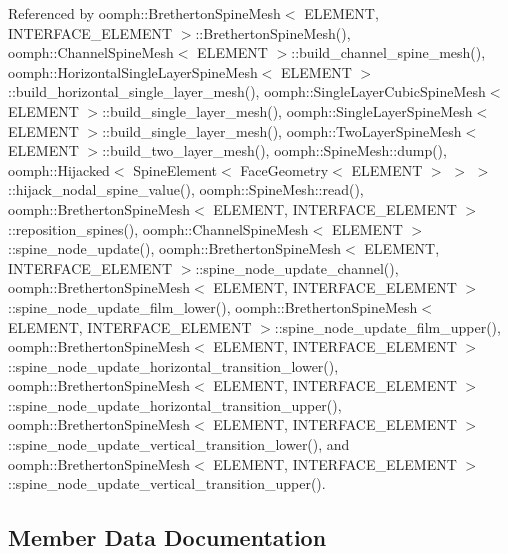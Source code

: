 Referenced by oomph\+::\+Bretherton\+Spine\+Mesh$<$ E\+L\+E\+M\+E\+N\+T, I\+N\+T\+E\+R\+F\+A\+C\+E\+\_\+\+E\+L\+E\+M\+E\+N\+T $>$\+::\+Bretherton\+Spine\+Mesh(), oomph\+::\+Channel\+Spine\+Mesh$<$ E\+L\+E\+M\+E\+N\+T $>$\+::build\+\_\+channel\+\_\+spine\+\_\+mesh(), oomph\+::\+Horizontal\+Single\+Layer\+Spine\+Mesh$<$ E\+L\+E\+M\+E\+N\+T $>$\+::build\+\_\+horizontal\+\_\+single\+\_\+layer\+\_\+mesh(), oomph\+::\+Single\+Layer\+Cubic\+Spine\+Mesh$<$ E\+L\+E\+M\+E\+N\+T $>$\+::build\+\_\+single\+\_\+layer\+\_\+mesh(), oomph\+::\+Single\+Layer\+Spine\+Mesh$<$ E\+L\+E\+M\+E\+N\+T $>$\+::build\+\_\+single\+\_\+layer\+\_\+mesh(), oomph\+::\+Two\+Layer\+Spine\+Mesh$<$ E\+L\+E\+M\+E\+N\+T $>$\+::build\+\_\+two\+\_\+layer\+\_\+mesh(), oomph\+::\+Spine\+Mesh\+::dump(), oomph\+::\+Hijacked$<$ Spine\+Element$<$ Face\+Geometry$<$ E\+L\+E\+M\+E\+N\+T $>$ $>$ $>$\+::hijack\+\_\+nodal\+\_\+spine\+\_\+value(), oomph\+::\+Spine\+Mesh\+::read(), oomph\+::\+Bretherton\+Spine\+Mesh$<$ E\+L\+E\+M\+E\+N\+T, I\+N\+T\+E\+R\+F\+A\+C\+E\+\_\+\+E\+L\+E\+M\+E\+N\+T $>$\+::reposition\+\_\+spines(), oomph\+::\+Channel\+Spine\+Mesh$<$ E\+L\+E\+M\+E\+N\+T $>$\+::spine\+\_\+node\+\_\+update(), oomph\+::\+Bretherton\+Spine\+Mesh$<$ E\+L\+E\+M\+E\+N\+T, I\+N\+T\+E\+R\+F\+A\+C\+E\+\_\+\+E\+L\+E\+M\+E\+N\+T $>$\+::spine\+\_\+node\+\_\+update\+\_\+channel(), oomph\+::\+Bretherton\+Spine\+Mesh$<$ E\+L\+E\+M\+E\+N\+T, I\+N\+T\+E\+R\+F\+A\+C\+E\+\_\+\+E\+L\+E\+M\+E\+N\+T $>$\+::spine\+\_\+node\+\_\+update\+\_\+film\+\_\+lower(), oomph\+::\+Bretherton\+Spine\+Mesh$<$ E\+L\+E\+M\+E\+N\+T, I\+N\+T\+E\+R\+F\+A\+C\+E\+\_\+\+E\+L\+E\+M\+E\+N\+T $>$\+::spine\+\_\+node\+\_\+update\+\_\+film\+\_\+upper(), oomph\+::\+Bretherton\+Spine\+Mesh$<$ E\+L\+E\+M\+E\+N\+T, I\+N\+T\+E\+R\+F\+A\+C\+E\+\_\+\+E\+L\+E\+M\+E\+N\+T $>$\+::spine\+\_\+node\+\_\+update\+\_\+horizontal\+\_\+transition\+\_\+lower(), oomph\+::\+Bretherton\+Spine\+Mesh$<$ E\+L\+E\+M\+E\+N\+T, I\+N\+T\+E\+R\+F\+A\+C\+E\+\_\+\+E\+L\+E\+M\+E\+N\+T $>$\+::spine\+\_\+node\+\_\+update\+\_\+horizontal\+\_\+transition\+\_\+upper(), oomph\+::\+Bretherton\+Spine\+Mesh$<$ E\+L\+E\+M\+E\+N\+T, I\+N\+T\+E\+R\+F\+A\+C\+E\+\_\+\+E\+L\+E\+M\+E\+N\+T $>$\+::spine\+\_\+node\+\_\+update\+\_\+vertical\+\_\+transition\+\_\+lower(), and oomph\+::\+Bretherton\+Spine\+Mesh$<$ E\+L\+E\+M\+E\+N\+T, I\+N\+T\+E\+R\+F\+A\+C\+E\+\_\+\+E\+L\+E\+M\+E\+N\+T $>$\+::spine\+\_\+node\+\_\+update\+\_\+vertical\+\_\+transition\+\_\+upper().



\subsection{Member Data Documentation}
\mbox{\label{classoomph_1_1SpineNode_a87d72975d31d015c4360b5092abdbf69}} 
